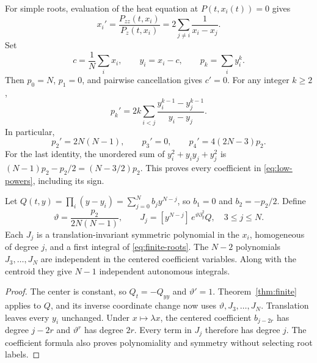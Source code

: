 For simple roots, evaluation of the heat equation at $P(t,x_i(t))=0$
gives
\begin{equation}
 x_i'=\frac{P_{zz}(t,x_i)}{P_z(t,x_i)}
       =2\sum_{j\ne i}\frac1{x_i-x_j}.
 \label{eq:finite-roots}
\end{equation}
Set
\begin{equation}
 c=\frac1N\sum_i x_i,\qquad y_i=x_i-c,\qquad p_k=\sum_i y_i^k.
 \label{eq:center}
\end{equation}
Then $p_0=N$, $p_1=0$, and pairwise cancellation gives $c'=0$.
For any integer $k\ge2$,
\begin{equation}
 p_k'=2k\sum_{i<j}\frac{y_i^{k-1}-y_j^{k-1}}{y_i-y_j}.
 \label{eq:powers}
\end{equation}
In particular,
\begin{equation}
 p_2'=2N(N-1),\qquad p_3'=0,\qquad p_4'=4(2N-3)p_2.
 \label{eq:low-powers}
\end{equation}
For the last identity, the unordered sum of $y_i^2+y_iy_j+y_j^2$
is $(N-1)p_2-p_2/2=(N-3/2)p_2$. This proves every coefficient
in \eqref{eq:low-powers}, including its sign.

\begin{corollary}
\label{cor:homogeneous}
Let $Q(t,y)=\prod_i(y-y_i)=\sum_{j=0}^N b_jy^{N-j}$, so $b_1=0$
and $b_2=-p_2/2$. Define
\begin{equation}
 \vartheta=\frac{p_2}{2N(N-1)},\qquad
 J_j=[y^{N-j}]\,e^{\vartheta\partial_y^2}Q,
 \quad 3\le j\le N.
 \label{eq:family}
\end{equation}
Each $J_j$ is a translation-invariant symmetric polynomial in the
$x_i$, homogeneous of degree $j$, and a first integral of
\eqref{eq:finite-roots}. The $N-2$ polynomials $J_3,\ldots,J_N$
are independent in the centered coefficient variables. Along with
the centroid they give $N-1$ independent autonomous integrals.
\end{corollary}
\begin{proof}
The center is constant, so $Q_t=-Q_{yy}$ and $\vartheta'=1$.
Theorem~\ref{thm:finite} applies to $Q$, and its inverse coordinate
change now uses $\vartheta,J_3,\ldots,J_N$. Translation leaves every
$y_i$ unchanged. Under $x\mapsto\lambda x$, the centered coefficient
$b_{j-2r}$ has degree $j-2r$ and $\vartheta^r$ has degree $2r$.
Every term in $J_j$ therefore has degree $j$. The coefficient formula
also proves polynomiality and symmetry without selecting root labels.
\end{proof}

